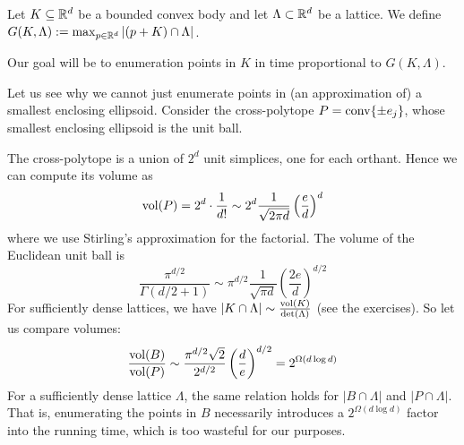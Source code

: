 \begin{definition}
  Let $K \subseteq \mathbb{R}^d $ be a bounded convex body and let $\Lambda \subset \mathbb{R}^d$ be a lattice.
  We define $G(K,\Lambda) := \max_{p \in \mathbb{R}^d} |(p + K) \cap \Lambda|$.
\end{definition}

Our goal will be to enumeration points in $K$ in time proportional to $G(K, \Lambda)$.

\begin{example}
  Let us see why we cannot just enumerate points in (an approximation of)
  a smallest enclosing ellipsoid.
  Consider the cross-polytope $P = \operatorname{conv}\{\pm e_j\}$,
  whose smallest enclosing ellipsoid is the unit ball.
  \begin{center}
  \end{center}
  The cross-polytope is a union of $2^d$ unit simplices,
  one for each orthant.
  Hence we can compute its volume as
  \[
    \operatorname{vol}(P) = 2^d \cdot \frac{1}{d!} \sim 2^d \frac{1}{\sqrt{2\pi d}} \left( \frac{e}{d} \right)^d
  \]
  where we use Stirling's approximation for the factorial.
  The volume of the Euclidean unit ball is
  \[
    \frac{\pi^{d/2}}{\Gamma(d/2 + 1)} \sim \pi^{d/2} \frac{1}{\sqrt{\pi d}} \left( \frac{2e}{d} \right)^{d/2}
  \]
  For sufficiently dense lattices, we have
  $|K \cap \Lambda| \sim \frac{\operatorname{vol}(K)}{\det(\Lambda)}$ (see the exercises).
  So let us compare volumes:
  \[
    \frac{\operatorname{vol}(B)}{\operatorname{vol}(P)} \sim \frac{\pi^{d/2} \sqrt{2}}{2^{d/2}} \left( \frac{d}{e} \right)^{d/2} = 2^{\Omega(d \log d)}
  \]
  For a sufficiently dense lattice $\Lambda$,
  the same relation holds for $|B \cap \Lambda|$ and $|P \cap \Lambda|$.
  That is, enumerating the points in $B$ necessarily introduces a $2^{\Omega(d \log d)}$ factor into the running time,
  which is too wasteful for our purposes.
\end{example}

